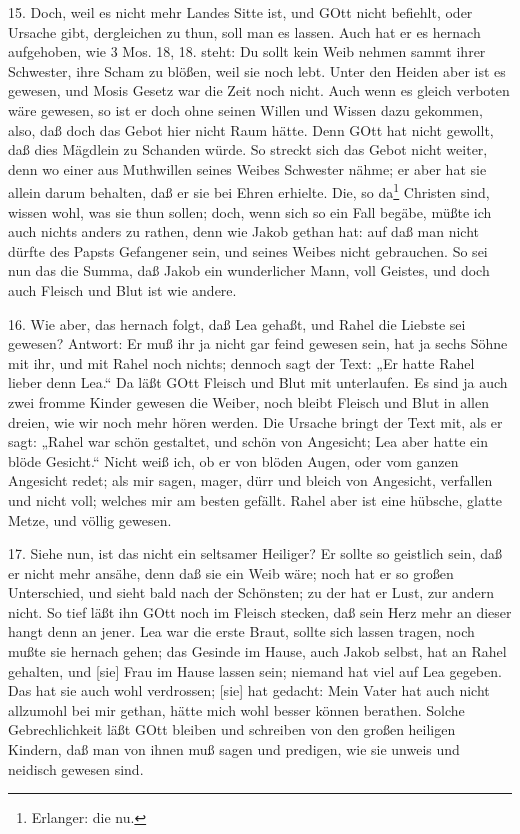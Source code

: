 15. Doch, weil es nicht mehr Landes Sitte ist, und GOtt nicht befiehlt, oder Ursache gibt, dergleichen zu thun, soll man es lassen. Auch hat er es hernach aufgehoben, wie 3 Mos. 18, 18. steht: Du sollt kein Weib nehmen sammt ihrer Schwester, ihre Scham zu blößen, weil sie noch lebt. Unter den Heiden aber ist es gewesen, und Mosis Gesetz war die Zeit noch nicht. Auch wenn es gleich verboten wäre gewesen, so ist er doch ohne seinen Willen und Wissen dazu gekommen, also, daß doch das Gebot hier nicht Raum hätte. Denn GOtt hat nicht gewollt, daß dies Mägdlein zu Schanden würde. So streckt sich das Gebot nicht weiter, denn wo einer aus Muthwillen seines Weibes Schwester nähme; er aber hat sie allein darum behalten, daß er sie bei Ehren erhielte. Die, so da\footnote{Erlanger: die nu.} Christen sind, wissen wohl, was sie thun sollen; doch, wenn sich so ein Fall begäbe, müßte ich auch nichts anders zu rathen, denn wie Jakob gethan hat: auf daß man nicht dürfte des Papsts Gefangener sein, und seines Weibes nicht gebrauchen. So sei nun das die Summa, daß Jakob ein wunderlicher Mann, voll Geistes, und doch auch Fleisch und Blut ist wie andere.

16. Wie aber, das hernach folgt, daß Lea gehaßt, und Rahel die Liebste sei gewesen? Antwort: Er muß ihr ja nicht gar feind gewesen sein, hat ja sechs Söhne mit ihr, und mit Rahel noch nichts; dennoch sagt der Text: „Er hatte Rahel lieber denn Lea.“ Da läßt GOtt Fleisch und Blut mit unterlaufen. Es sind ja auch zwei fromme Kinder gewesen die Weiber, noch bleibt Fleisch und Blut in allen dreien, wie wir noch mehr hören werden. Die Ursache bringt der Text mit, als er sagt: „Rahel war schön gestaltet, und schön von Angesicht; Lea aber hatte ein blöde Gesicht.“ Nicht weiß ich, ob er von blöden Augen, oder vom ganzen Angesicht redet; als mir sagen, mager, dürr und bleich von Angesicht, verfallen und nicht voll; welches mir am besten gefällt. Rahel aber ist eine hübsche, glatte Metze, und völlig gewesen.

17. Siehe nun, ist das nicht ein seltsamer Heiliger? Er sollte so geistlich sein, daß er nicht mehr ansähe, denn daß sie ein Weib wäre; noch hat er so großen Unterschied, und sieht bald nach der Schönsten; zu der hat er Lust, zur andern nicht. So tief läßt ihn GOtt noch im Fleisch stecken, daß sein Herz mehr an dieser hangt denn an jener. Lea war die erste Braut, sollte sich lassen tragen, noch mußte sie hernach gehen; das Gesinde im Hause, auch Jakob selbst, hat an Rahel gehalten, und [sie] Frau im Hause lassen sein; niemand hat viel auf Lea gegeben. Das hat sie auch wohl verdrossen; [sie] hat gedacht: Mein Vater hat auch nicht allzumohl bei mir gethan, hätte mich wohl besser können berathen. Solche Gebrechlichkeit läßt GOtt bleiben und schreiben von den großen heiligen Kindern, daß man von ihnen muß sagen und predigen, wie sie unweis und neidisch gewesen sind.

